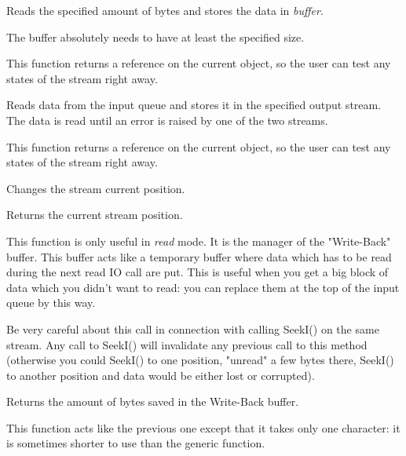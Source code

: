 Reads the specified amount of bytes and stores the data in {\it buffer}.


The buffer absolutely needs to have at least the specified size.


This function returns a reference on the current object, so the user can test
any states of the stream right away.


Reads data from the input queue and stores it in the specified output stream.
The data is read until an error is raised by one of the two streams.


This function returns a reference on the current object, so the user can test
any states of the stream right away.

\label{wxinputstreamseeki}


Changes the stream current position.



Returns the current stream position.

\label{wxinputstreamungetch}


This function is only useful in {\it read} mode. It is the manager of the "Write-Back"
buffer. This buffer acts like a temporary buffer where data which has to be
read during the next read IO call are put. This is useful when you get a big
block of data which you didn't want to read: you can replace them at the top
of the input queue by this way.

Be very careful about this call in connection with calling SeekI() on the same
stream. Any call to SeekI() will invalidate any previous call to this method
(otherwise you could SeekI() to one position, "unread" a few bytes there, SeekI()
to another position and data would be either lost or corrupted).


Returns the amount of bytes saved in the Write-Back buffer.


This function acts like the previous one except that it takes only one
character: it is sometimes shorter to use than the generic function.


